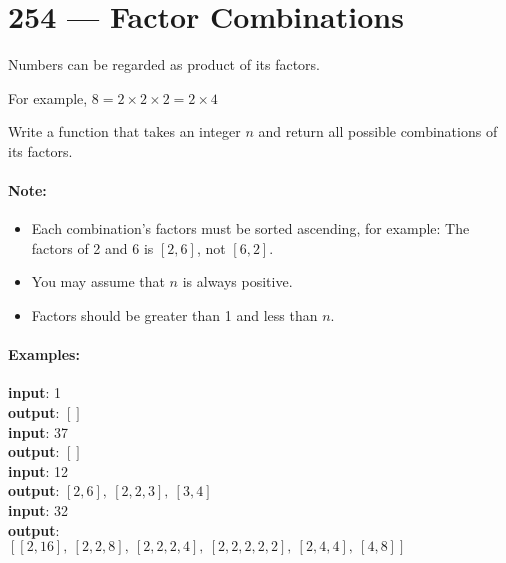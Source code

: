 \section{254 --- Factor Combinations}
Numbers can be regarded as product of its factors. 
\par
For example, $8 = 2 \times 2 \times 2 = 2\times 4$
\par
Write a function that takes an integer $n$ and return all possible combinations of its factors.

\paragraph{Note: }

\begin{itemize}
\item Each combination's factors must be sorted ascending, for example: The factors of 2 and 6 is $[2, 6]$, not $[6, 2]$.
\item You may assume that $n$ is always positive.
\item Factors should be greater than 1 and less than $n$.
\end{itemize}
 

\paragraph{Examples: }
\begin{flushleft}
\textbf{input}: 1
\\
\textbf{output}: $[]$
\\
\textbf{input}: 37
\\
\textbf{output}: $[]$
\\
\textbf{input}: 12
\\
\textbf{output}: $[2,6], \ [2, 2, 3], \ [3, 4]$
\\
\textbf{input}: 32
\\
\textbf{output}:
\\
$[[2, 16],\  [2, 2, 8],\  [2, 2, 2, 4],\ [2, 2, 2, 2, 2],\   [2, 4, 4],\ [4, 8]]$
\end{flushleft}
